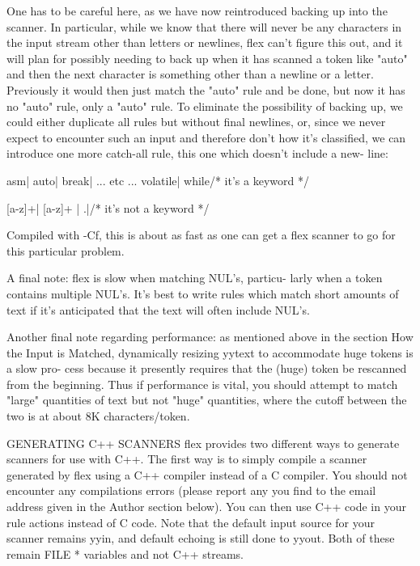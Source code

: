 \documentclass[12pt,spanish,twocolumn,lettersize]{article}
\begin{document}
{       One  has	 to  be careful here, as we have now reintroduced
       backing up into the scanner.  In particular, while we know
       that  there  will  never	 be  any  characters in the input
       stream other than letters or newlines, flex  can't  figure
       this out, and it will plan for possibly needing to back up
       when it has scanned a token like "auto" and then the  next
       character  is  something other than a newline or a letter.
       Previously it would then just match the "auto" rule and be
       done, but now it has no "auto" rule, only a "auto\n" rule.
       To eliminate the	 possibility  of  backing  up,	we  could
       either duplicate all rules but without final newlines, or,
       since we never expect  to  encounter  such  an  input  and
       therefore  don't how it's classified, we can introduce one
       more catch-all rule, this one which doesn't include a new-
       line:

	   asm\n    |
	   auto\n   |
	   break\n  |
	   ... etc ...
	   volatile\n |
	   while\n  /* it's a keyword */

	   [a-z]+\n |
	   [a-z]+   |
	   .|\n	    /* it's not a keyword */

       Compiled	 with -Cf, this is about as fast as one can get a
       flex scanner to go for this particular problem.

       A final note: flex is slow when matching	 NUL's,	 particu-
       larly  when a token contains multiple NUL's.  It's best to
       write rules which match short  amounts  of  text	 if  it's
       anticipated that the text will often include NUL's.

       Another	final  note  regarding	performance: as mentioned
       above in the section How the Input is Matched, dynamically
       resizing	 yytext to accommodate huge tokens is a slow pro-
       cess because it presently requires that the  (huge)  token
       be  rescanned  from the beginning.  Thus if performance is
       vital, you should attempt to match "large"  quantities  of
       text  but  not "huge" quantities, where the cutoff between
       the two is at about 8K characters/token.

GENERATING C++ SCANNERS
       flex provides two different ways to generate scanners  for
       use  with  C++.	 The  first  way  is  to simply compile a
       scanner generated by flex using a C++ compiler instead  of
       a  C  compiler.	You should not encounter any compilations
       errors (please report any you find to  the  email  address
       given  in the Author section below).  You can then use C++
       code in your rule actions instead of C  code.   Note  that
       the  default  input  source for your scanner remains yyin,
       and default echoing is still done to yyout.  Both of these
       remain FILE * variables and not C++ streams.

}
\end{document}
